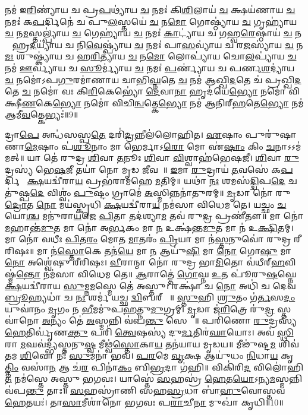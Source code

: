 𑌨𑌮॑ 𑌇\ul{𑌰𑌿}𑌣𑍍𑌯𑌾॑𑌯 𑌚 𑌪𑍍𑌰\ul{𑌪}𑌥𑍍𑌯𑌾॑𑌯 \ul{𑌚} 𑌨𑌮𑌃॑ 𑌕𑌿\ul{𑌶𑌿}𑌲𑌾𑌯॑ \ul{𑌚} 𑌕𑍍𑌷𑌯॑𑌣𑌾𑌯 \ul{𑌚} 𑌨𑌮𑌃॑ 𑌕\ul{𑌪}𑌰𑍍𑌦𑌿𑌨𑍇॑ 𑌚 𑌪𑍁\ul{𑌲}𑌸𑍍𑌤𑌯𑍇॑ \ul{𑌚} 𑌨\ul{𑌮𑍋} 𑌗𑍋𑌷𑍍𑌠𑍍𑌯𑌾॑𑌯 \ul{𑌚} 𑌗𑍃𑌹𑍍𑌯𑌾॑𑌯 \ul{𑌚} 𑌨\ul{𑌮}𑌸𑍍𑌤𑌲𑍍𑌪𑍍𑌯𑌾॑𑌯 \ul{𑌚} 𑌗𑍇𑌹𑍍𑌯𑌾॑𑌯 \ul{𑌚} 𑌨𑌮𑌃॑ \ul{𑌕𑌾}𑌟𑍍𑌯𑌾॑𑌯 𑌚 𑌗𑌹𑍍𑌵\ul{𑌰𑍇}𑌷𑍍𑌠𑌾𑌯॑ \ul{𑌚} 𑌨𑌮𑍋᳚ 𑌹𑍍𑌰\ul{𑌦}𑌯𑍍𑌯𑌾॑𑌯 𑌚 𑌨𑌿\ul{𑌵𑍇}𑌷𑍍𑌪𑍍𑌯𑌾॑𑌯 \ul{𑌚} 𑌨𑌮𑌃॑ 𑌪𑌾\ul{𑌸}𑌵𑍍𑌯𑌾॑𑌯 𑌚 𑌰\ul{𑌜}𑌸𑍍𑌯𑌾॑𑌯 \ul{𑌚} 𑌨\ul{𑌮𑌃} 𑌶𑍁𑌷𑍍𑌕𑍍𑌯𑌾॑𑌯 𑌚 𑌹\ul{𑌰𑌿}𑌤𑍍𑌯𑌾॑𑌯 \ul{𑌚} 𑌨\ul{𑌮𑍋} 𑌲𑍋𑌪𑍍𑌯𑌾॑𑌯 𑌚𑍋\ul{𑌲}𑌪𑍍𑌯𑌾॑𑌯 \ul{𑌚} 𑌨𑌮॑ \ul{𑌊}𑌰𑍍𑌵𑍍𑌯𑌾॑𑌯 𑌚 \ul{𑌸𑍂}𑌰𑍍𑌮𑍍𑌯𑌾॑𑌯 \ul{𑌚} 𑌨𑌮𑌃॑ \ul{𑌪}𑌰𑍍𑌣𑍍𑌯𑌾॑𑌯 𑌚 𑌪𑌰𑍍𑌣\ul{𑌶}𑌦𑍍𑌯𑌾॑𑌯 \ul{𑌚} 𑌨𑌮𑍋॑𑌽𑌪\ul{𑌗𑍁}𑌰𑌮𑌾॑𑌣𑌾𑌯 𑌚𑌾𑌭𑌿\ul{𑌘𑍍𑌨}𑌤𑍇 \ul{𑌚} 𑌨𑌮॑ 𑌆𑌖𑍍𑌖𑌿\ul{𑌦}𑌤𑍇 𑌚॑ 𑌪𑍍𑌰𑌖𑍍𑌖𑌿\ul{𑌦}𑌤𑍇 \ul{𑌚} 𑌨𑌮𑍋॑ 𑌵𑌃 𑌕𑌿\ul{𑌰𑌿}𑌕𑍇𑌭𑍍𑌯𑍋॑ \ul{𑌦𑍇}𑌵𑌾\ul{𑌨𑌾}\ul{} 𑌹𑍃𑌦॑𑌯𑍇\ul{𑌭𑍍𑌯𑍋} 𑌨𑌮𑍋॑ 𑌵𑌿𑌕𑍍𑌷𑍀\ul{𑌣}𑌕𑍇\ul{𑌭𑍍𑌯𑍋} 𑌨𑌮𑍋॑ 𑌵𑌿𑌚𑌿\ul{𑌨𑍍𑌵}𑌤𑍍𑌕𑍇\ul{𑌭𑍍𑌯𑍋} 𑌨𑌮॑ 𑌆𑌨𑌿𑌰𑍍‌\ul{𑌹}𑌤𑍇\ul{𑌭𑍍𑌯𑍋} 𑌨𑌮॑ 𑌆𑌮𑍀\ul{𑌵}𑌤𑍍𑌕𑍇𑌭𑍍𑌯𑌃॑॥9॥ 

𑌦𑍍𑌰𑌾\ul{𑌪𑍇} 𑌅𑌨𑍍𑌧॑𑌸𑌸𑍍𑌪\ul{𑌤𑍇} 𑌦𑌰𑌿॑\ul{𑌦𑍍𑌰}𑌨𑍍𑌨𑍀𑌲॑𑌲𑍋𑌹𑌿𑌤। \ul{𑌏}𑌷𑌾𑌂 𑌪𑍁𑌰𑍁॑𑌷𑌾𑌣𑌾\ul{𑌮𑍇}𑌷𑌾𑌂 𑌪॑\ul{𑌶𑍂}𑌨𑌾𑌂 𑌮𑌾 𑌭𑍇𑌰𑍍𑌮𑌾𑌽\ul{𑌰𑍋} 𑌮𑍋 𑌏॑\ul{𑌷𑌾𑌂} 𑌕𑌿𑌂 \ul{𑌚}𑌨𑌾𑌽𑌽𑌮॑𑌮𑌤𑍍॥ 𑌯𑌾 𑌤𑍇॑ 𑌰𑍁𑌦𑍍𑌰 \ul{𑌶𑌿}𑌵𑌾 \ul{𑌤}𑌨𑍂𑌃 \ul{𑌶𑌿}𑌵𑌾 \ul{𑌵𑌿}𑌶𑍍𑌵𑌾𑌹॑𑌭𑍇𑌷𑌜𑍀। \ul{𑌶𑌿}𑌵𑌾 \ul{𑌰𑍁}𑌦𑍍𑌰𑌸𑍍𑌯॑ 𑌭𑍇\ul{𑌷}𑌜𑍀 𑌤𑌯𑌾॑ 𑌨𑍋 𑌮𑍃𑌡 \ul{𑌜𑍀}𑌵𑌸𑍇᳚॥ \ul{𑌇}𑌮𑌾 \ul{𑌰𑍁}𑌦𑍍𑌰𑌾𑌯॑ \ul{𑌤}𑌵𑌸𑍇॑ 𑌕\ul{𑌪}𑌰𑍍𑌦𑌿𑌨𑍇᳚ \ul{𑌕𑍍𑌷}𑌯𑌦𑍍𑌵𑍀॑𑌰𑌾\ul{𑌯} 𑌪𑍍𑌰𑌭॑𑌰𑌾𑌮𑌹𑍇 \ul{𑌮}𑌤𑌿𑌮𑍍॥ 𑌯𑌥𑌾॑ \ul{𑌨𑌃} 𑌶𑌮𑌸॑\ul{𑌦𑍍𑌦𑍍𑌵𑌿}𑌪\ul{𑌦𑍇} 𑌚𑌤𑍁॑𑌷𑍍𑌪\ul{𑌦𑍇} 𑌵𑌿𑌶𑍍𑌵𑌂॑ \ul{𑌪𑍁}𑌷𑍍𑌟𑌂 𑌗𑍍𑌰𑌾𑌮𑍇॑ \ul{𑌅}𑌸𑍍𑌮𑌿𑌨𑍍𑌨𑌨𑌾॑𑌤𑍁𑌰𑌮𑍍॥ \ul{𑌮𑍃}𑌡𑌾 𑌨𑍋॑ 𑌰𑍁\ul{𑌦𑍍𑌰𑍋}𑌤 \ul{𑌨𑍋} 𑌮𑌯॑𑌸𑍍𑌕𑍃𑌧𑌿 \ul{𑌕𑍍𑌷}𑌯𑌦𑍍𑌵𑍀॑𑌰𑌾\ul{𑌯} 𑌨𑌮॑𑌸𑌾 𑌵𑌿𑌧𑍇𑌮 𑌤𑍇। 𑌯𑌚𑍍𑌛𑌂 \ul{𑌚} 𑌯𑍋\ul{𑌶𑍍𑌚} 𑌮𑌨𑍁॑𑌰𑌾\ul{𑌯}𑌜𑍇 \ul{𑌪𑌿}𑌤𑌾 𑌤𑌦॑𑌶𑍍𑌯𑌾\ul{𑌮} 𑌤𑌵॑ 𑌰𑍁\ul{𑌦𑍍𑌰} 𑌪𑍍𑌰𑌣𑍀॑𑌤𑍗॥ 𑌮𑌾 𑌨𑍋॑ \ul{𑌮}𑌹𑌾𑌨𑍍𑌤॑\ul{𑌮𑍁}𑌤 𑌮𑌾 𑌨𑍋॑ 𑌅\ul{𑌰𑍍𑌭}𑌕𑌂 𑌮𑌾 \ul{𑌨} 𑌉𑌕𑍍𑌷॑𑌨𑍍𑌤\ul{𑌮𑍁}𑌤 𑌮𑌾 𑌨॑ 𑌉\ul{𑌕𑍍𑌷𑌿}𑌤𑌮𑍍। 𑌮𑌾 𑌨𑍋॑ 𑌵𑌧𑍀𑌃 \ul{𑌪𑌿}𑌤\ul{𑌰𑌂} 𑌮𑍋𑌤 \ul{𑌮𑌾}𑌤𑌰𑌂॑ \ul{𑌪𑍍𑌰𑌿}𑌯𑌾 𑌮𑌾 𑌨॑\ul{𑌸𑍍𑌤}𑌨𑍁𑌵𑍋॑ 𑌰𑍁𑌦𑍍𑌰 𑌰𑍀𑌰𑌿𑌷𑌃॥ 𑌮𑌾 𑌨॑\ul{𑌸𑍍𑌤𑍋}𑌕𑍇 𑌤𑌨॑\ul{𑌯𑍇} 𑌮𑌾 \ul{𑌨} 𑌆𑌯𑍁॑\ul{𑌷𑌿} 𑌮𑌾 \ul{𑌨𑍋} 𑌗𑍋\ul{𑌷𑍁} 𑌮𑌾 \ul{𑌨𑍋} 𑌅𑌶𑍍𑌵𑍇॑𑌷𑍁 𑌰𑍀𑌰𑌿𑌷𑌃। \ul{𑌵𑍀}𑌰𑌾𑌨𑍍𑌮𑌾 𑌨𑍋॑ 𑌰𑍁𑌦𑍍𑌰 𑌭𑌾\ul{𑌮𑌿}𑌤𑍋 𑌵॑𑌧𑍀𑌰𑍍‌\ul{𑌹}𑌵𑌿𑌷𑍍𑌮॑\ul{𑌨𑍍𑌤𑍋} 𑌨𑌮॑𑌸𑌾 𑌵𑌿𑌧𑍇𑌮 𑌤𑍇॥ \ul{𑌆}𑌰𑌾𑌤𑍍𑌤𑍇॑ \ul{𑌗𑍋}𑌘𑍍𑌨 \ul{𑌉}𑌤 𑌪𑍂॑𑌰𑍁\ul{𑌷}𑌘𑍍𑌨𑍇 \ul{𑌕𑍍𑌷}𑌯𑌦𑍍𑌵𑍀॑𑌰𑌾𑌯 \ul{𑌸𑍁}𑌮𑍍𑌨\ul{𑌮}𑌸𑍍𑌮𑍇 𑌤𑍇॑ 𑌅𑌸𑍍𑌤𑍁। 𑌰𑌕𑍍𑌷𑌾॑ 𑌚 \ul{𑌨𑍋} 𑌅𑌧𑌿॑ 𑌚 𑌦𑍇𑌵 \ul{𑌬𑍍𑌰𑍂}𑌹𑍍𑌯𑌧𑌾॑ 𑌚 \ul{𑌨𑌃} 𑌶𑌰𑍍𑌮॑ 𑌯𑌚𑍍𑌛 \ul{𑌦𑍍𑌵𑌿}𑌬𑌰𑍍‌𑌹𑌾𑌃᳚॥ \ul{𑌸𑍍𑌤𑍁}𑌹𑌿 \ul{𑌶𑍍𑌰𑍁}𑌤𑌂 𑌗॑\ul{𑌰𑍍𑌤}𑌸\ul{𑌦𑌂} 𑌯𑍁𑌵𑌾॑𑌨𑌂 \ul{𑌮𑍃}𑌗𑌂 𑌨 \ul{𑌭𑍀}𑌮𑌮𑍁॑𑌪\ul{𑌹}𑌤𑍍𑌨𑍁\ul{𑌮𑍁}𑌗𑍍𑌰𑌮𑍍। \ul{𑌮𑍃}𑌡𑌾 𑌜॑\ul{𑌰𑌿}𑌤𑍍𑌰𑍇 𑌰𑍁॑\ul{𑌦𑍍𑌰} 𑌸𑍍𑌤𑌵𑌾॑𑌨𑍋 \ul{𑌅}𑌨𑍍𑌯𑌂 𑌤𑍇॑ \ul{𑌅}𑌸𑍍𑌮𑌨𑍍𑌨𑌿 𑌵॑𑌪\ul{𑌨𑍍𑌤𑍁} 𑌸𑍇𑌨𑌾𑌃᳚॥ 𑌪𑌰𑌿॑𑌣𑍋 \ul{𑌰𑍁}𑌦𑍍𑌰𑌸𑍍𑌯॑ \ul{𑌹𑍇}𑌤𑌿𑌰𑍍𑌵𑍃॑𑌣\ul{𑌕𑍍𑌤𑍁} 𑌪𑌰𑌿॑ \ul{𑌤𑍍𑌵𑍇}𑌷𑌸𑍍𑌯॑ 𑌦𑍁\ul{𑌰𑍍𑌮}𑌤𑌿𑌰॑\ul{𑌘𑌾}𑌯𑍋𑌃। 𑌅𑌵॑ \ul{𑌸𑍍𑌥𑌿}𑌰𑌾 \ul{𑌮}𑌘𑌵॑𑌦𑍍𑌭𑍍𑌯𑌸𑍍𑌤𑌨𑍁\ul{𑌷𑍍𑌵} 𑌮𑍀𑌢𑍍𑌵॑\ul{𑌸𑍍𑌤𑍋}𑌕𑌾\ul{𑌯} 𑌤𑌨॑𑌯𑌾𑌯 𑌮𑍃𑌡𑌯॥ 𑌮𑍀𑌢𑍁॑𑌷𑍍𑌟\ul{𑌮} 𑌶𑌿𑌵॑𑌤𑌮 \ul{𑌶𑌿}𑌵𑍋 𑌨𑌃॑ \ul{𑌸𑍁}𑌮𑌨𑌾॑ 𑌭𑌵। \ul{𑌪}\ul{𑌰}𑌮𑍇 \ul{𑌵𑍃}𑌕𑍍𑌷 𑌆𑌯𑍁॑𑌧𑌂 \ul{𑌨𑌿}𑌧𑌾\ul{𑌯} 𑌕𑍃\ul{𑌤𑍍𑌤𑌿𑌂} 𑌵𑌸𑌾॑\ul{𑌨} 𑌆 𑌚॑\ul{𑌰} 𑌪𑌿𑌨𑌾॑\ul{𑌕𑌂} 𑌬𑌿\ul{𑌭𑍍𑌰}𑌦𑌾 𑌗॑𑌹𑌿॥ 𑌵𑌿𑌕𑌿॑𑌰𑌿\ul{𑌦} 𑌵𑌿𑌲𑍋॑𑌹𑌿\ul{𑌤} 𑌨𑌮॑𑌸𑍍𑌤𑍇 𑌅𑌸𑍍𑌤𑍁 𑌭𑌗𑌵𑌃। 𑌯𑌾𑌸𑍍𑌤𑍇॑ \ul{𑌸}𑌹𑌸𑍍𑌰॑ \ul{𑌹𑍇}𑌤\ul{𑌯𑍋}𑌽𑌨𑍍𑌯\ul{𑌮}𑌸𑍍𑌮𑌨𑍍𑌨𑌿 𑌵॑𑌪\ul{𑌨𑍍𑌤𑍁} 𑌤𑌾𑌃॥ \ul{𑌸}𑌹𑌸𑍍𑌰𑌾॑𑌣𑌿 𑌸𑌹\ul{𑌸𑍍𑌰}𑌧𑌾 𑌬𑌾॑\ul{𑌹𑍁}𑌵𑍋𑌸𑍍𑌤𑌵॑ \ul{𑌹𑍇}𑌤𑌯𑌃॑। 𑌤𑌾\ul{𑌸𑌾}𑌮𑍀𑌶𑌾॑𑌨𑍋 𑌭𑌗𑌵𑌃 𑌪\ul{𑌰𑌾}𑌚𑍀\ul{𑌨𑌾} 𑌮𑍁𑌖𑌾॑ 𑌕𑍃𑌧𑌿॥10॥

